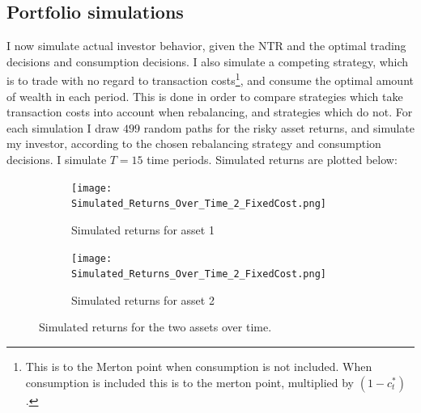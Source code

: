 \documentclass[11pt]{article}
\begin{document}
\subsection{Portfolio simulations} \label{Subsection: Portfolio_Simulations}
I now simulate actual investor behavior, given the \ac{NTR} and the optimal trading decisions and consumption decisions.
I also simulate a competing strategy, which is to trade with no regard to transaction costs\footnote{This is to the Merton point when consumption is not included. 
When consumption is included this is to the merton point, multiplied by $(1-c^{*}_{t})$.}, and consume the optimal amount of wealth in each period.
This is done in order to compare strategies which take transaction costs into account when rebalancing, and strategies which do not.
For each simulation I draw $499$ random paths for the risky asset returns, and simulate my investor, according to the chosen rebalancing strategy and consumption decisions.
I simulate $T=15$ time periods. Simulated returns are plotted below:
\begin{figure}[!ht]
    \centering
    \begin{subfigure}[t]{0.49\textwidth}
        \centering
        \texttt{[image: Simulated\_Returns\_Over\_Time\_2\_FixedCost.png]}
        \caption{Simulated returns for asset 1}
    \end{subfigure}%
    \hfill
    \begin{subfigure}[t]{0.49\textwidth}
        \centering
        \texttt{[image: Simulated\_Returns\_Over\_Time\_2\_FixedCost.png]}
        \caption{Simulated returns for asset 2}
    \end{subfigure}
\caption{Simulated returns for the two assets over time.}
\end{figure}
\FloatBarrier %
\end{document}
